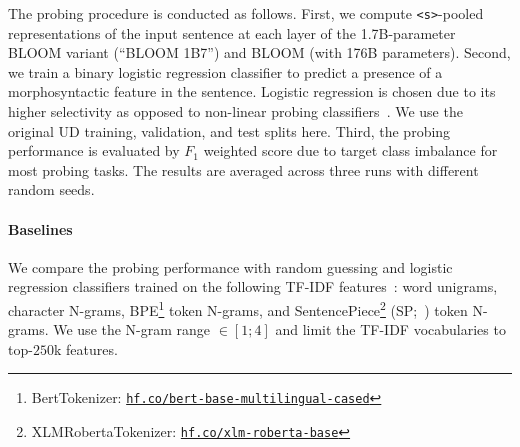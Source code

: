 \documentclass[twoside,11pt]{article}
\begin{document}
\begin{table}[ht!]
    \centering
    \caption{Examples of the Number task in English and Spanish. The subject number indicator is highlighted in \textbf{bold}. The task is to predict if the sentence includes a singular subject number (upper sentence) and a plural subject number (bottom sentence).}
    \label{tab:probing_task_ex}
\end{table}

The probing procedure is conducted as follows. First, we compute \texttt{<s>}-pooled representations of the input sentence at each layer of the 1.7B-parameter BLOOM variant (``BLOOM 1B7'') and BLOOM (with 176B parameters). Second, we train a binary logistic regression classifier to predict a presence of a morphosyntactic feature in the sentence. Logistic regression is chosen due to its higher selectivity as opposed to non-linear probing classifiers~\citep{hewitt-liang-2019-designing}. We use the original UD training, validation, and test splits here. Third, the probing performance is evaluated by $F_1$ weighted score due to target class imbalance for most probing tasks. The results are averaged across three runs with different random seeds.

\paragraph{Baselines} We compare the probing performance with random guessing and logistic regression classifiers trained on the following TF-IDF features~\citep{salton1973specification}: word unigrams, character N-grams, BPE\footnote{BertTokenizer: \href{https://hf.co/bert-base-multilingual-cased}{\texttt{hf.co/bert-base-multilingual-cased}}} token N-grams, and  SentencePiece\footnote{XLMRobertaTokenizer: \href{https://hf.co/xlm-roberta-base}{\texttt{hf.co/xlm-roberta-base}}} (SP;~\citealp{kudo-richardson-2018-sentencepiece}) token N-grams. We use the N-gram range $\in [1; 4]$ and limit the TF-IDF vocabularies to top-$250$k features. 
\end{document}
